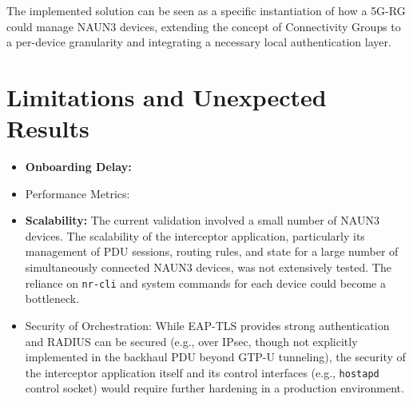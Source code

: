 The implemented solution can be seen as a specific instantiation of how a \ac{5G-RG} could manage \ac{NAUN3} devices, extending the concept of Connectivity Groups to a per-device granularity and integrating a necessary local authentication layer.

\section{Limitations and Unexpected Results}

\begin{itemize}
    \item \textbf{Onboarding Delay:} %

    \item Performance Metrics: %

    \item \textbf{Scalability:} The current validation involved a small number of \ac{NAUN3} devices. The scalability of the interceptor application, particularly its management of \ac{PDU} sessions, routing rules, and state for a large number of simultaneously connected \ac{NAUN3} devices, was not extensively tested. The reliance on \texttt{nr-cli} and system commands for each device could become a bottleneck.

    \item Security of Orchestration: While \ac{EAP-TLS} provides strong authentication and \ac{RADIUS} can be secured (e.g., over \ac{IPsec}, though not explicitly implemented in the backhaul \ac{PDU} beyond \ac{GTP-U} tunneling), the security of the interceptor application itself and its control interfaces (e.g., \texttt{hostapd} control socket) would require further hardening in a production environment.


\end{itemize}
